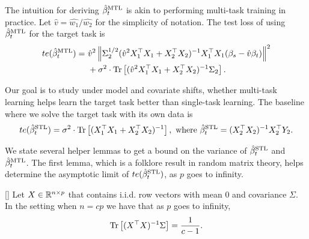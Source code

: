 The intuition for deriving $\hat{\beta}_t^{\text{MTL}}$ is akin to performing multi-task training in practice.
Let $\hat{v} = \hat{w_1} / \hat{w_2}$ for the simplicity of notation.
The test loss of using $\hat{\beta}_t^{\text{MTL}}$ for the target task is
\begin{align}
	te(\hat{\beta}_t^{\text{MTL}}) =&~ \hat{v}^2 \left\| \Sigma_2^{1/2}(\hat{v}^2 X_1^{\top}X_1 + X_2^{\top}X_2)^{-1} X_1^{\top}X_1 (\beta_s - \hat{v} \beta_t) \right\|^2 \nonumber \\
			&~ + \sigma^2 \cdot \operatorname{Tr}\left[(\hat{v}^2 X_1^{\top}X_1 + X_2^{\top}X_2)^{-1} \Sigma_2\right]. \label{eq_te_mtl_2task}
\end{align}

Our goal is to study under model and covariate shifts, whether multi-task learning helps learn the target task better than single-task learning.
The baseline where we solve the target task with its own data is
\begin{align*}
	te(\hat{\beta}_t^{\text{STL}}) = \sigma^2 \cdot \operatorname{Tr}\left[(X_1^{\top}X_1 + X_2^{\top}X_2)^{-1}\right], \text{ where } \hat{\beta}_t^{\text{STL}} = (X_2^{\top}X_2)^{-1} X_2^{\top}Y_2.
\end{align*}

We state several helper lemmas to get a bound on the variance of $\hat{\beta}_t^{\text{STL}}$ and $\hat{\beta}_t^{\text{MTL}}$.
The first lemma, which is a folklore result in random matrix theory, helps determine the asymptotic limit of $te(\hat{\beta}_t^{\text{STL}})$, as $p$ goes to infinity.
\begin{lemma}\label{lem_minv}[]
	Let $X\in\mathbb{R}^{n\times p}$ that contains i.i.d. row vectors with mean $0$ and covariance $\Sigma$.
	In the setting when $n = c p$ we have that as $p$ goes to infinity,
	\[ \operatorname{Tr}\left[(X^{\top}X)^{-1}\Sigma\right] = \frac{1}{c - 1}. \]
\end{lemma}

